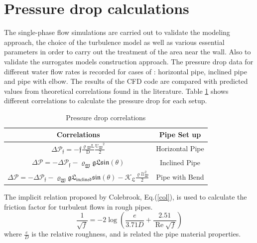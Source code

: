 \documentclass[11pt]{report}
\begin{document}
\section{Pressure drop calculations}\label{single}
%
The single-phase flow simulations are carried out to validate the modeling approach, the choice of the turbulence model as well as various essential parameters in order to carry out the treatment of the area near the wall. 
%
Also to validate the surrogates models construction  approach. 
%
The pressure drop data for different water flow rates is recorded for cases of : horizontal pipe, inclined pipe and pipe with elbow. 
%
The results of the CFD code are compared with predicted values from theoretical correlations found in the literature. 
%
Table \ref{tab:PD} shows different correlations to calculate the pressure drop for each setup.
%
\begin{table}[ht!]
\begin{center}
\caption{Pressure drop correlations}\label{tab:PD}
\begin{tabular}{cc}
\hline Correlations & Pipe Set up  \\
\hline
$ \displaystyle 
\Delta \mathcal{P_\mathfrak{f}=\mathfrak{-f}\frac{\mathrm{\varrho\mathfrak{_{W}}} \mathrm{L}}{\mathrm{D}} \frac{\mathrm{U\mathfrak{_{W}}}^\mathrm{{2}}}{\mathrm{2}}}
$ & Horizontal Pipe \\
$ \displaystyle 
\Delta \mathcal{P}=-\Delta \mathcal{P_\mathfrak{f}-\varrho_\mathfrak{{W}} \mathfrak{g} \mathfrak{ L} \mathfrak{sin(\theta)}}
$ & Inclined Pipe \\
$ \displaystyle 
\Delta \mathcal{P} =-\Delta \mathcal{ P_\mathfrak{f}-\varrho_\mathfrak{{W}} \mathfrak{g} \mathfrak{L}_\mathfrak{{inclined}} \mathfrak{sin(\theta)}- K_\mathfrak{{L}} \frac{\mathrm{\varrho} U_\mathfrak{{W}}^\mathrm{{2}}}{\mathrm{2}}}
$ & Pipe with Bend   \\
\hline
\end{tabular}
\end{center}
\end{table}
%
The implicit relation proposed by Colebrook, Eq.(\ref{col}), is used to calculate the friction factor for turbulent flows in rough pipes.
%
\begin{equation}
\frac{1}{\sqrt{f}}=-2 \log \left(\frac{e}{3.71 D}+\frac{2.51}{\operatorname{Re} \sqrt{f}}\right)
\label{col}
\end{equation}
%
where $\frac{e}{D}$ is the relative roughness, and is related the pipe material properties.
%
\end{document}
